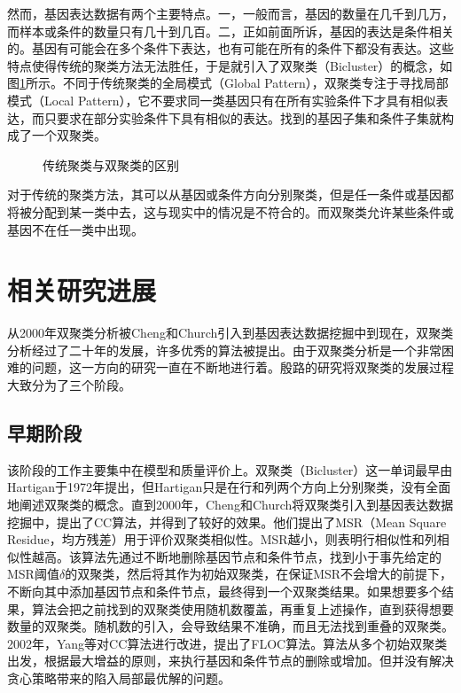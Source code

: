     然而，基因表达数据有两个主要特点。一，一般而言，基因的数量在几千到几万，而样本或条件的数量只有几十到几百。二，正如前面所诉，基因的表达是条件相关的。基因有可能会在多个条件下表达，也有可能在所有的条件下都没有表达。这些特点使得传统的聚类方法无法胜任，于是就引入了双聚类（Bicluster）的概念，如图\ref{fig:tradiAndBi}所示。不同于传统聚类的全局模式（Global Pattern），双聚类专注于寻找局部模式（Local Pattern），它不要求同一类基因只有在所有实验条件下才具有相似表达，而只要求在部分实验条件下具有相似的表达。找到的基因子集和条件子集就构成了一个双聚类。

    \begin{figure}[htbp]
    \setlength{\subfigcapskip}{-1bp}
    \centering
    \begin{minipage}{.9\textwidth}
    \centering
    \subfigure{}\addtocounter{subfigure}{-2}
    \subfigure{\subfigure[基因方向的传统聚类]{\texttt{[image: 1]}}}
    \hspace{.1em}
    \subfigure{}\addtocounter{subfigure}{-2}
    \subfigure{\subfigure[条件方向的传统聚类]{\texttt{[image: 2]}}}
    \hspace{.1em}
    \subfigure{}\addtocounter{subfigure}{-2}
    \subfigure{\subfigure[双聚类]{\texttt{[image: 3]}}}
    \end{minipage}
    \vspace{0.2em}
    \caption{传统聚类与双聚类的区别}
    \label{fig:tradiAndBi}
    \end{figure}
    对于传统的聚类方法，其可以从基因或条件方向分别聚类，但是任一条件或基因都将被分配到某一类中去，这与现实中的情况是不符合的。而双聚类允许某些条件或基因不在任一类中出现。

\section{相关研究进展}
    从2000年双聚类分析被Cheng和Church引入到基因表达数据挖掘中到现在，双聚类分析经过了二十年的发展，许多优秀的算法被提出。由于双聚类分析是一个非常困难的问题，这一方向的研究一直在不断地进行着。殷路的研究将双聚类的发展过程大致分为了三个阶段。
    \subsection{早期阶段}
    该阶段的工作主要集中在模型和质量评价上。双聚类（Bicluster）这一单词最早由Hartigan于1972年提出，但Hartigan只是在行和列两个方向上分别聚类，没有全面地阐述双聚类的概念。直到2000年，Cheng和Church将双聚类引入到基因表达数据挖掘中，提出了CC算法，并得到了较好的效果。他们提出了MSR（Mean Square Residue，均方残差）用于评价双聚类相似性。MSR越小，则表明行相似性和列相似性越高。该算法先通过不断地删除基因节点和条件节点，找到小于事先给定的MSR阈值$\delta$的双聚类，然后将其作为初始双聚类，在保证MSR不会增大的前提下，不断向其中添加基因节点和条件节点，最终得到一个双聚类结果。如果想要多个结果，算法会把之前找到的双聚类使用随机数覆盖，再重复上述操作，直到获得想要数量的双聚类。随机数的引入，会导致结果不准确，而且无法找到重叠的双聚类。2002年，Yang等对CC算法进行改进，提出了FLOC算法。算法从多个初始双聚类出发，根据最大增益的原则，来执行基因和条件节点的删除或增加。但并没有解决贪心策略带来的陷入局部最优解的问题。


